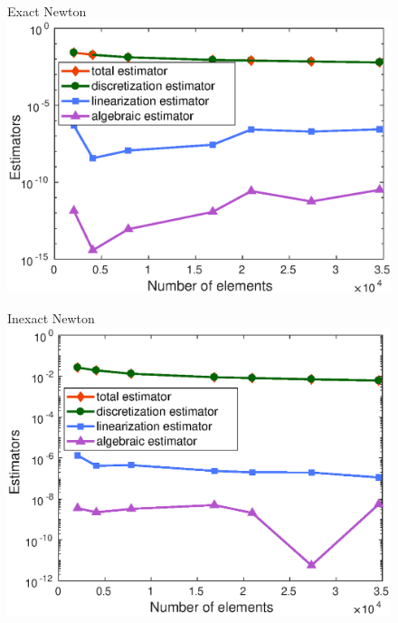 \documentclass{beamer}
\begin{document}
\begin{frame}
\begin{figure}
\begin{minipage}[c]{.34\linewidth}
   \centering
   \quad Exact Newton
\includegraphics[width=\textwidth]{fig_article/exact_resolution_convergence_estimator_number_elements.eps}    
\end{minipage}\hfill
\begin{minipage}[c]{.33\linewidth}
   \centering
   \quad Inexact Newton
\includegraphics[width=\textwidth]{fig_article/inexact_resolution_convergence_estimator_number_elements.eps}    
\end{minipage}\hfill
\begin{minipage}[c]{.33\linewidth}

\end{minipage}
\end{figure}
\end{frame}
\end{document}
